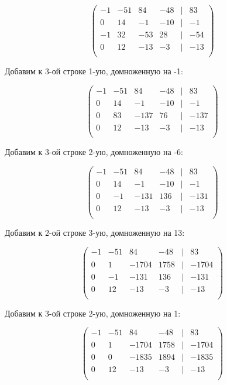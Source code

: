	\[
	\begin{pmatrix}
	-1 & -51 & 84 & -48 & | & 83 \\
	0 & 14 & -1 & -10 & | & -1 \\
	-1 & 32 & -53 & 28 & | & -54 \\
	0 & 12 & -13 & -3 & | & -13 \\
	\end{pmatrix}
	\]
	
	Добавим к 3-ой строке 1-ую, домноженную на -1:
	
	\[
	\begin{pmatrix}
	-1 & -51 & 84 & -48 & | & 83 \\
	0 & 14 & -1 & -10 & | & -1 \\
	0 & 83 & -137 & 76 & | & -137 \\
	0 & 12 & -13 & -3 & | & -13 \\
	\end{pmatrix}
	\]
	
	Добавим к 3-ой строке 2-ую, домноженную на -6:
	
	\[
	\begin{pmatrix}
	-1 & -51 & 84 & -48 & | & 83 \\
	0 & 14 & -1 & -10 & | & -1 \\
	0 & -1 & -131 & 136 & | & -131 \\
	0 & 12 & -13 & -3 & | & -13 \\
	\end{pmatrix}
	\]
	
	Добавим к 2-ой строке 3-ую, домноженную на 13:
	
	\[
	\begin{pmatrix}
	-1 & -51 & 84 & -48 & | & 83 \\
	0 & 1 & -1704 & 1758 & | & -1704 \\
	0 & -1 & -131 & 136 & | & -131 \\
	0 & 12 & -13 & -3 & | & -13 \\
	\end{pmatrix}
	\]
	
	Добавим к 3-ой строке 2-ую, домноженную на 1:
	
	\[
	\begin{pmatrix}
	-1 & -51 & 84 & -48 & | & 83 \\
	0 & 1 & -1704 & 1758 & | & -1704 \\
	0 & 0 & -1835 & 1894 & | & -1835 \\
	0 & 12 & -13 & -3 & | & -13 \\
	\end{pmatrix}
	\]
	
